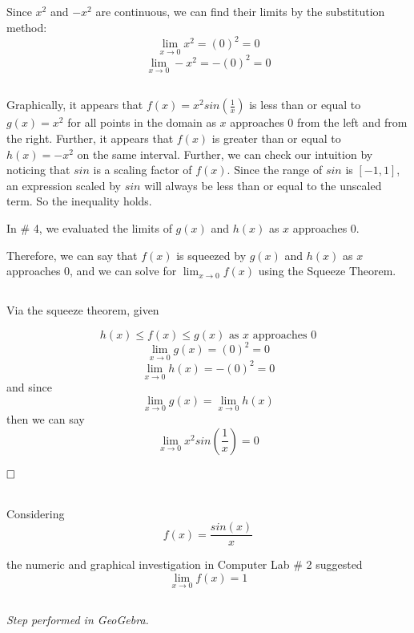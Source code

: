 \documentclass{article}
\begin{document}
\subsection{}
Since $x^2$ and $-x^2$ are continuous, we can find their limits by the substitution method:
$$
\lim_{x \rightarrow 0}x^2 = (0)^2 = \boxed{0}
$$
$$
\lim_{x \rightarrow 0}-x^2 = -(0)^2 = \boxed{0}
$$

\subsection{}
Graphically, it appears that $f(x)=x^2sin(\frac{1}{x})$ is less than or equal to $g(x)=x^2$ for all points in the domain as $x$ approaches 0 from the left and from the right. Further, it appears that $f(x)$ is greater than or equal to $h(x)=-x^2$ on the same interval. Further, we can check our intuition by noticing that $sin$ is a scaling factor of $f(x)$. Since the range of $sin$ is $[-1,1]$, an expression scaled by $sin$ will always be less than or equal to the unscaled term. So the inequality holds.

In \# 4, we evaluated the limits of $g(x)$ and $h(x)$ as $x$ approaches 0.

Therefore, we can say that $f(x)$ is squeezed by $g(x)$ and $h(x)$ as $x$ approaches 0, and we can solve for $\lim_{x \rightarrow 0}f(x)$ using the Squeeze Theorem.

\subsection{}
Via the squeeze theorem, given

$$
h(x) \leq f(x) \leq g(x) \text{  as $x$ approaches 0}
$$
$$
\lim_{x \rightarrow 0}g(x) = (0)^2 = \boxed{0}
$$
$$
\lim_{x \rightarrow 0}h(x) = -(0)^2 = \boxed{0}
$$
and since
$$
\lim_{x \rightarrow 0}g(x) = \lim_{x \rightarrow 0}h(x)
$$
then we can say
$$ \lim_{x \rightarrow 0} x^2 sin(\frac{1}{x}) = \boxed{0} $$

$\hfill \square$


\subsection{}
Considering
$$
f(x) = \frac{sin(x)}{x}
$$

the numeric and graphical investigation in Computer Lab \# 2 suggested
$$
\lim_{x \rightarrow 0} f(x) = \boxed{1}
$$

\subsection{}
\emph{Step performed in GeoGebra.}
\end{document}

